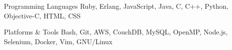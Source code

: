 

\begin{cvskills}

  \cvskill
    {Programming Languages} %
    {Ruby, Erlang, JavaScript, Java, C, C++, Python, Objective-C, HTML, CSS} %

  \cvskill
  {Platforms \& Tools} %
    {Bash, Git, AWS, CouchDB, MySQL, OpenMP, Node.js, Selenium, Docker, Vim, GNU/Linux} %

\end{cvskills}
